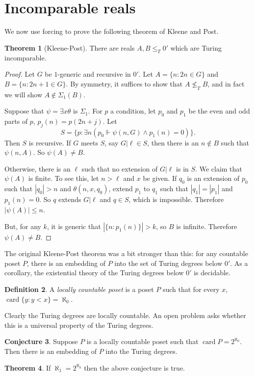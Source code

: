\documentclass[12pt]{report}
\newcommand{\card}{\operatorname{card}}
\newcommand{\forces}{\Vdash}
\newcommand{\dfn}[1]{\emph{#1}\index{#1}}
\theoremstyle{definition}
\newtheorem{theorem}{Theorem}[chapter]
\newtheorem{conjecture}[theorem]{Conjecture}
\newtheorem{definition}[theorem]{Definition}
\begin{document}
\section{Incomparable reals}
We now use forcing to prove the following theorem of Kleene and Post.
\begin{theorem}[Kleene-Post]
There are reals $A, B \leq_T 0'$ which are Turing incomparable.
\end{theorem}
\begin{proof}
Let $G$ be $1$-generic and recursive in $0'$. Let $A = \{n: 2n \in G\}$ and $B = \{n: 2n + 1 \in G\}$. By symmetry, it suffices to show that $A \not \leq_T B$, and in fact we will show $A \notin \Sigma_1(B)$.

Suppose that $\psi = \exists x \theta$ is $\Sigma_1$. For $p$ a condition, let $p_0$ and $p_1$ be the even and odd parts of $p$, $p_j(n) = p(2n+j)$. Let
$$S = \{p: \exists n(p_0 \forces \psi(n, G) \wedge p_1(n) = 0)\}.$$
Then $S$ is recursive.
If $G$ meets $S$, say $G|\ell \in S$, then there is an $n \notin B$ such that $\psi(n, A)$. So $\psi(A) \neq B$.

Otherwise, there is an $\ell$ such that no extension of $G|\ell$ is in $S$. We claim that $\psi(A)$ is finite. To see this, let $n > \ell$ and $x$ be given.
If $q_0$ is an extension of $p_0$ such that $|q_0| > n$ and $\theta(n, x, q_0)$, extend $p_1$ to $q_1$ such that $|q_1| = |p_1|$ and $p_1(n) = 0$. So $q$ extends $G|\ell$ and $q \in S$, which is impossible. Therefore $|\psi(A)| \leq n$.

But, for any $k$, it is generic that $|\{n: p_1(n)\}|>k$, so $B$ is infinite. Therefore $\psi(A) \neq B$.
\end{proof}
The original Kleene-Post theorem was a bit stronger than this: for any countable poset $P$, there is an embedding of $P$ into the set of Turing degrees below $0'$.
As a corollary, the existential theory of the Turing degrees below $0'$ is decidable.

\begin{definition}
A \dfn{locally countable poset} is a poset $P$ such that for every $x$, $\card \{y: y < x\} = \aleph_0$.
\end{definition}
Clearly the Turing degrees are locally countable. An open problem asks whether this is a universal property of the Turing degrees.
\begin{conjecture}
Suppose $P$ is a locally countable poset such that $\card P = 2^{\aleph_0}$. Then there is an embedding of $P$ into the Turing degrees.
\end{conjecture}
\begin{theorem}
If $\aleph_1 = 2^{\aleph_0}$ then the above conjecture is true.
\end{theorem}
\end{document}
